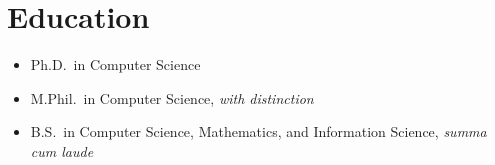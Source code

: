 \section{Education}
\begin{itemize}[leftmargin=-0.4mm,partopsep=0pt,label=]
  \item {}
    Ph.D.\ in Computer Science %

  \item {}
    M.Phil.\ in Computer Science, \emph{with distinction} %

  \item {}
    B.S.\ in Computer Science, Mathematics, and Information Science, \emph{summa cum laude} %
\end{itemize}
 \vspace{-0.5em}




